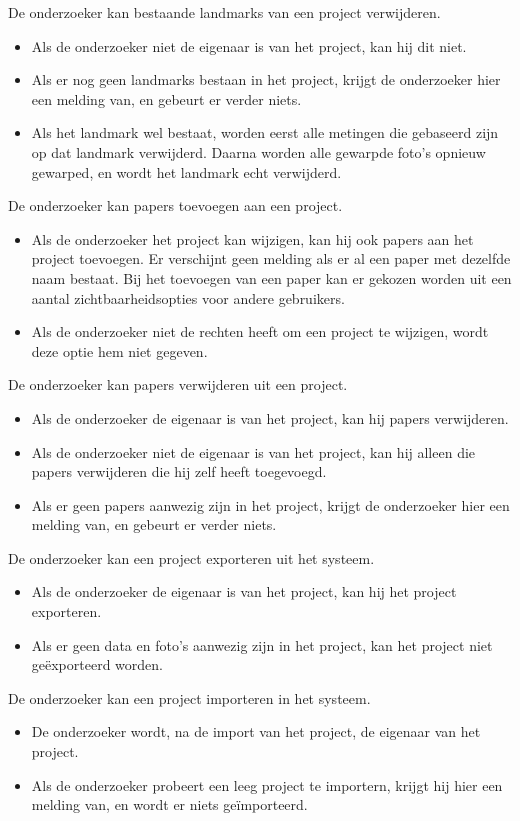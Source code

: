 De onderzoeker kan bestaande landmarks van een project verwijderen.
\begin{itemize}
	\item Als de onderzoeker niet de eigenaar is van het project, kan hij dit niet.
	\item Als er nog geen landmarks bestaan in het project, krijgt de onderzoeker hier een melding van, en gebeurt er verder niets.
	\item Als het landmark wel bestaat, worden eerst alle metingen die gebaseerd zijn op dat landmark verwijderd. Daarna worden alle gewarpde foto's opnieuw gewarped, en wordt het landmark echt verwijderd.
\end{itemize}

De onderzoeker kan papers toevoegen aan een project.
\begin{itemize}
	\item Als de onderzoeker het project kan wijzigen, kan hij ook papers aan het project toevoegen. Er verschijnt geen melding als er al een paper met dezelfde naam bestaat. Bij het toevoegen van een paper kan er gekozen worden uit een aantal zichtbaarheidsopties voor andere gebruikers.
	\item Als de onderzoeker niet de rechten heeft om een project te wijzigen, wordt deze optie hem niet gegeven.
\end{itemize}

De onderzoeker kan papers verwijderen uit een project.
\begin{itemize}
	\item Als de onderzoeker de eigenaar is van het project, kan hij papers verwijderen.
	\item Als de onderzoeker niet de eigenaar is van het project, kan hij alleen die papers verwijderen die hij zelf heeft toegevoegd.
	\item Als er geen papers aanwezig zijn in het project, krijgt de onderzoeker hier een melding van, en gebeurt er verder niets.
\end{itemize}

De onderzoeker kan een project exporteren uit het systeem.
\begin{itemize}
	\item Als de onderzoeker de eigenaar is van het project, kan hij het project exporteren.
	\item Als er geen data en foto's aanwezig zijn in het project, kan het project niet ge\"exporteerd worden.
\end{itemize}

De onderzoeker kan een project importeren in het systeem.
\begin{itemize}
	\item De onderzoeker wordt, na de import van het project, de eigenaar van het project.
	\item Als de onderzoeker probeert een leeg project te importern, krijgt hij hier een melding van, en wordt er niets ge\"importeerd.
\end{itemize}

